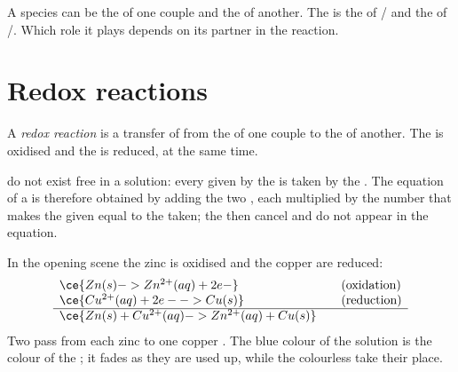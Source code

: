 \begin{remark}\label{rem:g11:redox:amphoteric}
A species can be the  of one couple and the  of another.
The   is the  of / and the
 of /. Which role it plays depends on
its partner in the reaction.
\end{remark}

\section{Redox reactions}

\begin{definition}\label{def:g11:redox:reaction}
A \emph{redox reaction} is a transfer of 
from the  of one couple to the  of another. The
 is oxidised and the  is reduced, at the same time.
\end{definition}

\begin{proposition}\label{prop:g11:redox:no-free-electrons}
 do not exist free in a solution: every  given by the
 is taken by the . The equation of a  is
therefore obtained by adding the two , each multiplied by
the number that makes the  given equal to the 
taken; the  then cancel and do not appear in the equation.
\end{proposition}

\begin{example}\label{ex:g11:redox:zinc-copper}
In the opening scene the zinc is oxidised and the copper  are
reduced:
\[
\begin{array}{l@{\qquad}l}
  \ce{Zn(s) -> Zn^{2+}(aq) + 2e-} & \text{(oxidation)}\\
  \ce{Cu^{2+}(aq) + 2e- -> Cu(s)} & \text{(reduction)}\\
  \hline
  \ce{Zn(s) + Cu^{2+}(aq) -> Zn^{2+}(aq) + Cu(s)} &
\end{array}
\]
Two  pass from each zinc  to one copper . The blue
colour of the solution is the colour of the  ; it fades
as they are used up, while the colourless   take their
place.
\end{example}


